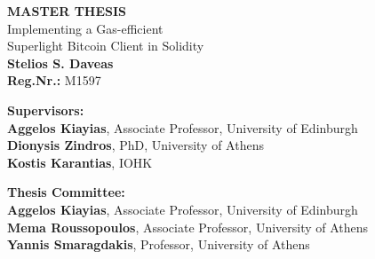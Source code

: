 \begin{center}
\begin{footnotesize}
    \vspace{3cm}
    \textbf{MASTER THESIS}\\
    \vspace{3cm}
    Implementing a Gas-efficient\\Superlight Bitcoin Client in Solidity\\
    \vspace{3cm}
    \textbf{Stelios S. Daveas}\\
    \textbf{Reg.Nr.:} M1597

    \vspace{5cm}
    \begin{flushleft}
        \textbf{Supervisors:}\\
        \hspace{1.5cm}
        \textbf{Aggelos Kiayias}, Associate Professor, University of Edinburgh\\
        \hspace{1.5cm}
        \textbf{Dionysis Zindros}, PhD, University of Athens\\
        \hspace{1.5cm}
        \textbf{Kostis Karantias}, IOHK

        \vspace{1cm}

        \textbf{Thesis Committee:}\\
        \hspace{1.5cm}
        \textbf{Aggelos Kiayias}, Associate Professor, University of Edinburgh\\
        \hspace{1.5cm}
        \textbf{Mema Roussopoulos}, Associate Professor, University of Athens\\
        \hspace{1.5cm}
        \textbf{Yannis Smaragdakis}, Professor, University of Athens

    \end{flushleft}
\end{footnotesize}
\end{center}
\pagebreak
